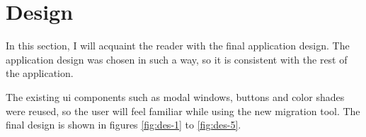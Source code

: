 \section{Design}\label{sec:design}

In this section, I will acquaint the reader with the final application design.
The application design was chosen in such a way, so it is consistent with the rest of the application.

The existing \gls{ui} components such as modal windows, buttons and color shades were reused, so the user will feel familiar while using the new migration tool.
The final design is shown in figures \ref{fig:des-1} to \ref{fig:des-5}.





